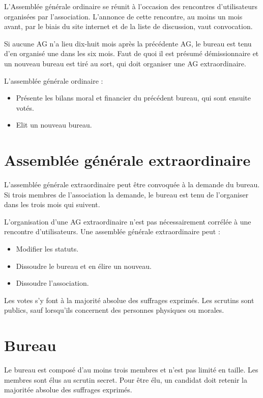 \documentclass[11pt]{article}
\begin{document}
L'Assemblée générale ordinaire se réunit à l'occasion des rencontres d'utilisateurs organisées par l'association. 
L'annonce de cette rencontre, au moins un mois avant, par le biais du site internet et de la liste de discussion, vaut convocation.

Si aucune AG n'a lieu dix-huit mois après la précédente AG, le bureau est tenu d'en organisé une dans les six mois.
Faut de quoi il est présumé démissionnaire et un nouveau bureau est tiré au sort, qui doit organiser une AG extraordinaire.

L'assemblée générale ordinaire :
\begin{itemize}
	\item Présente les bilans moral et financier du précédent bureau, qui sont ensuite votés.
	\item Elit un nouveau bureau.
\end{itemize}

\section{Assemblée générale extraordinaire}

L'assemblée générale extraordinaire peut être convoquée à la demande du bureau. Si trois membres de l'association la demande, le bureau est tenu de l'organiser dans les trois mois qui suivent.

L'organisation d'une AG extraordinaire n'est pas nécessairement corrélée à une rencontre d'utilisateurs. 
Une assemblée générale extraordinaire peut :
\begin{itemize}
	\item Modifier les statuts.
	\item Dissoudre le bureau et en élire un nouveau.
	\item Dissoudre l'association.
\end{itemize}

Les votes s'y font à la majorité absolue des suffrages exprimés. Les scrutins sont publics, sauf lorsqu'ils concernent des personnes physiques ou morales.


\section{Bureau}

Le bureau est composé d'au moins trois membres et n'est pas limité en taille. Les membres sont élus au scrutin secret. Pour être élu, un candidat doit retenir la majoritée absolue des suffrages exprimés.
\end{document}
